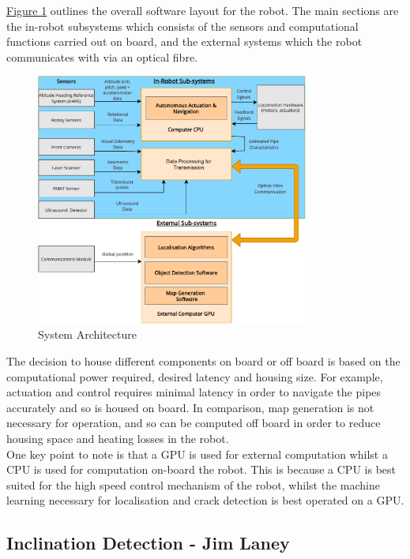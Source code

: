 \documentclass[11pt]{article}		%
\newcommand{\figref}[1]{\hyperref[#1]{Figure \ref*{#1}}}    %
\begin{document}
	         \figref{overalls} outlines the overall software layout for the robot. The main sections are the in-robot subsystems which consists of the sensors and computational functions carried out on board, and the external systems which the robot communicates with via an optical fibre. 
	         \\
    		\begin{figure}[h]
				\centering
				\includegraphics[width = 0.8\textwidth]{subsystemss}
				\caption{System Architecture}
				\label{overalls}
			\end{figure}
	         \hspace*{3ex}The decision to house different components on board or off board is based on the computational power required, desired latency and housing size. For example, actuation and control requires minimal latency in order to navigate the pipes accurately and so is housed on board. In comparison, map generation is not necessary for operation, and so can be computed off board in order to reduce housing space and heating losses in the robot. \\
	
      		\hspace*{3ex}One key point to note is that a GPU is used for external computation whilst a CPU is used for computation on-board the robot. This is because a CPU is best suited for the high speed control mechanism of the robot, whilst the machine learning necessary for localisation and crack detection is best operated on a GPU.
	          
		\subsection[Inclination Detection]{Inclination Detection - Jim Laney} \label{poseCalculation}
		
\end{document}
